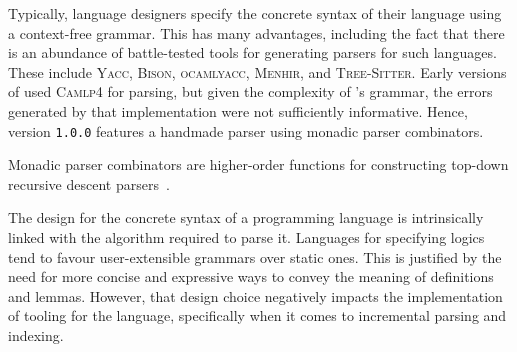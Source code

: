 

Typically, language designers specify the concrete syntax of their language using a context-free grammar.
This has many advantages, including the fact that there is an abundance of battle-tested tools for generating parsers for such languages.
These include \textsc{Yacc}, \textsc{Bison}, \textsc{ocamlyacc}, \textsc{Menhir}, and \textsc{Tree-Sitter}.
Early versions of \Beluga used \textsc{Camlp4} for parsing, but given the complexity of \Beluga's grammar, the errors generated by that implementation were not sufficiently informative.
Hence, \Beluga version \texttt{1.0.0} features a handmade parser using monadic parser combinators.


Monadic parser combinators are higher-order functions for constructing top-down recursive descent parsers~\cite{Burge1975-BURRPT, hutton1996monadic, leijen2001parsec, 10.1145/2847538.2847539}.



The design for the concrete syntax of a programming language is intrinsically linked with the algorithm required to parse it.
Languages for specifying logics tend to favour user-extensible grammars over static ones.
This is justified by the need for more concise and expressive ways to convey the meaning of definitions and lemmas.
However, that design choice negatively impacts the implementation of tooling for the language, specifically when it comes to incremental parsing and indexing.



